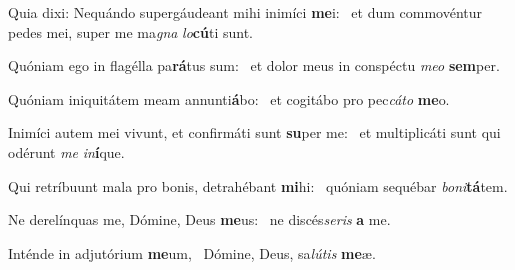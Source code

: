\item Quia dixi: Nequándo supergáudeant mihi inimíci \textbf{me}i:~\psstar{} et dum commovéntur pedes mei, super me ma\textit{gna} \textit{lo}\textbf{cú}ti sunt.
\item Quóniam ego in flagélla pa\textbf{rá}tus sum:~\psstar{} et dolor meus in conspéctu \textit{meo} \textbf{sem}per.
\item Quóniam iniquitátem meam annunti\textbf{á}bo:~\psstar{} et cogitábo pro pec\textit{cáto} \textbf{me}o.
\item Inimíci autem mei vivunt, et confirmáti sunt \textbf{su}per me:~\psstar{} et multiplicáti sunt qui odérunt \textit{me} \textit{in}\textbf{í}que.
\item Qui retríbuunt mala pro bonis, detrahébant \textbf{mi}hi:~\psstar{} quóniam sequébar \textit{boni}\textbf{tá}tem.
\item Ne derelínquas me, Dómine, Deus \textbf{me}us:~\psstar{} ne discés\textit{seris} \textbf{a} me.
\item Inténde in adjutórium \textbf{me}um,~\psstar{} Dómine, Deus, sa\textit{lútis} \textbf{me}æ.
